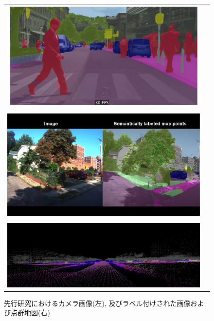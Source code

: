 \begin{figure}[htbp]
\begin{tabular}{cc}
\begin{minipage}[t]{1.0\hsize}
\begin{center}
\includegraphics[width=14cm]{./picture/semseg.jpg}
\caption{セマンティックセグメンテーションの例}
\label{fig:ICNet}
\end{center}
\end{minipage} \\ \\
\begin{minipage}[t]{1.0\hsize}
\begin{center}
\includegraphics[width=14cm]{./picture/LongTermLocalization.png}
\caption{先行研究におけるカメラ画像(左), 及びラベル付けされた画像および点群地図(右)}
\label{fig:SemanticPointLocalizationMap}
\end{center}
\end{minipage} \\ \\
\begin{minipage}{1.0\hsize}
\begin{center}
\includegraphics[width=14cm]{./picture/pc_map.png}

\end{center}
\end{minipage}
\end{tabular}
\end{figure}
